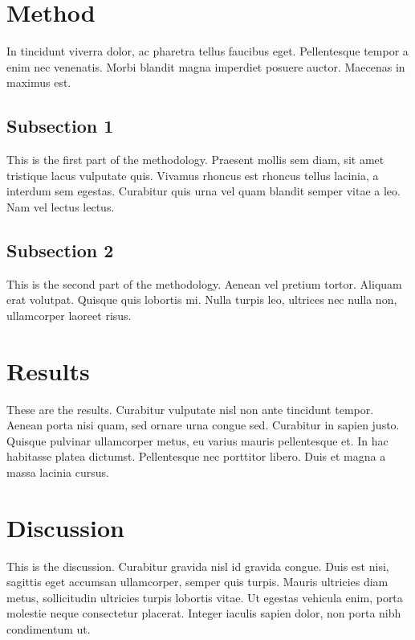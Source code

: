 \documentclass[12pt,a4paperpaper,]{report}
\begin{document}
\section{Method}\label{method-3}

In tincidunt viverra dolor, ac pharetra tellus faucibus eget.
Pellentesque tempor a enim nec venenatis. Morbi blandit magna imperdiet
posuere auctor. Maecenas in maximus est.

\subsection{Subsection 1}\label{subsection-1-2}

This is the first part of the methodology. Praesent mollis sem diam, sit
amet tristique lacus vulputate quis. Vivamus rhoncus est rhoncus tellus
lacinia, a interdum sem egestas. Curabitur quis urna vel quam blandit
semper vitae a leo. Nam vel lectus lectus.

\subsection{Subsection 2}\label{subsection-2-3}

This is the second part of the methodology. Aenean vel pretium tortor.
Aliquam erat volutpat. Quisque quis lobortis mi. Nulla turpis leo,
ultrices nec nulla non, ullamcorper laoreet risus.

\section{Results}\label{results-4}

These are the results. Curabitur vulputate nisl non ante tincidunt
tempor. Aenean porta nisi quam, sed ornare urna congue sed. Curabitur in
sapien justo. Quisque pulvinar ullamcorper metus, eu varius mauris
pellentesque et. In hac habitasse platea dictumst. Pellentesque nec
porttitor libero. Duis et magna a massa lacinia cursus.

\section{Discussion}\label{discussion-4}

This is the discussion. Curabitur gravida nisl id gravida congue. Duis
est nisi, sagittis eget accumsan ullamcorper, semper quis turpis. Mauris
ultricies diam metus, sollicitudin ultricies turpis lobortis vitae. Ut
egestas vehicula enim, porta molestie neque consectetur placerat.
Integer iaculis sapien dolor, non porta nibh condimentum ut.
\end{document}
